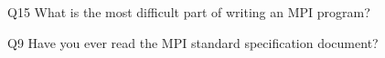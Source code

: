 \begin{description}%
\item{Q15} What is the most difficult part of writing an MPI program?%
\item{Q9} Have you ever read the MPI standard specification document?%
\end{description}%
